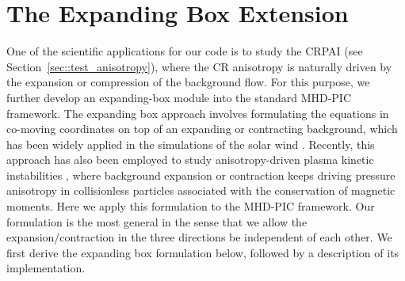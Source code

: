\documentclass[fleqn,usenatbib]{mnras}
\begin{document}
\section{The Expanding Box Extension}
One of the scientific applications for our code is to study the CRPAI (see Section~\ref{sec::test_anisotropy}), where the CR anisotropy is naturally driven by the expansion or compression of the background flow. For this purpose, we further develop an expanding-box module into the standard MHD-PIC framework.
The expanding box approach involves formulating the equations in co-moving coordinates on top of an expanding or contracting background, which has been widely applied in the simulations of the solar wind \citep[e.g.,][]{1993PhRvL..70.2190G,2020ApJ...888...68S,2020ApJ...891L...2S}. Recently, this approach has also been employed to study anisotropy-driven plasma kinetic instabilities \citep{2015ApJ...800...88S,2015ApJ...800...89S,2021ApJ...922L..35B}, where background expansion or contraction keeps driving pressure anisotropy in collisionless particles associated with the conservation of magnetic moments. Here we apply this formulation to the MHD-PIC framework.
Our formulation is the most general in the sense that we allow the expansion/contraction in the three directions be independent of each other. We first derive the expanding box formulation below, followed by a description of its implementation.
\end{document}
